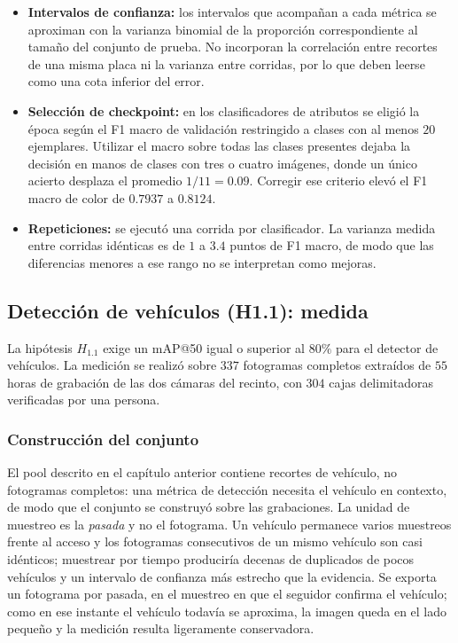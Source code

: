 \begin{itemize}
        calculada por recorte y acompañada de su equivalente por placa.
        La exactitud por carácter se calcula como $1 - \mathrm{CER}$ promediado
        por placa, es decir, un promedio macro que asigna el mismo peso a cada
        matrícula; no se reporta el agregado micro sobre el total de caracteres.
        Para detección, precisión, exhaustividad, mAP@50 y mAP@50--95.
    \item \textbf{Intervalos de confianza:} los intervalos que acompañan a cada
        métrica se aproximan con la varianza binomial de la proporción
        correspondiente al tamaño del conjunto de prueba. No incorporan la
        correlación entre recortes de una misma placa ni la varianza entre
        corridas, por lo que deben leerse como una cota inferior del error.
    \item \textbf{Selección de checkpoint:} en los clasificadores de atributos se
        eligió la época según el F1 macro de validación restringido a clases con
        al menos $20$ ejemplares. Utilizar el macro sobre todas las clases
        presentes dejaba la decisión en manos de clases con tres o cuatro
        imágenes, donde un único acierto desplaza el promedio $1/11 = 0{.}09$.
        Corregir ese criterio elevó el F1 macro de color de $0{.}7937$ a
        $0{.}8124$.
    \item \textbf{Repeticiones:} se ejecutó una corrida por clasificador. La
        varianza medida entre corridas idénticas es de $1$ a $3{.}4$ puntos de
        F1 macro, de modo que las diferencias menores a ese rango no se
        interpretan como mejoras.
\end{itemize}

\subsection{Detección de vehículos (H1.1): medida}
\label{subsec:resultados_deteccion}

La hipótesis $H_{1{.}1}$ exige un mAP@50 igual o superior al $80\%$ para el detector
de vehículos. La medición se realizó sobre $337$ fotogramas completos extraídos de
$55$ horas de grabación de las dos cámaras del recinto, con $304$ cajas
delimitadoras verificadas por una persona.

\subsubsection{Construcción del conjunto}

El pool descrito en el capítulo anterior contiene recortes de vehículo, no
fotogramas completos: una métrica de detección necesita el vehículo en contexto,
de modo que el conjunto se construyó sobre las grabaciones. La unidad de muestreo
es la \emph{pasada} y no el fotograma. Un vehículo permanece varios muestreos
frente al acceso y los fotogramas consecutivos de un mismo vehículo son casi
idénticos; muestrear por tiempo produciría decenas de duplicados de pocos
vehículos y un intervalo de confianza más estrecho que la evidencia. Se exporta un
fotograma por pasada, en el muestreo en que el seguidor confirma el vehículo; como
en ese instante el vehículo todavía se aproxima, la imagen queda en el lado
pequeño y la medición resulta ligeramente conservadora.

